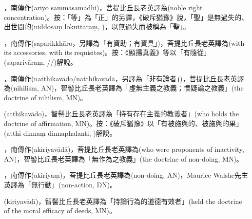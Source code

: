 \startitemgroup[noteitems]
\item{}，南傳作(ariyo sammāsamādhi)，菩提比丘長老英譯為(noble right concentration)。按：「等」為「正」的另譯，《破斥猶豫》說，「聖」是無過失的、出世間的(niddosaṃ lokuttaraṃ, )，以無過失而被稱為「聖」。
\stopitemgroup

\startitemgroup[noteitems]
\item{}，南傳作(saparikkhāro，另譯為「有資助；有資具」)，菩提比丘長老英譯為(with its accessories, with its requisites)。按：《顯揚真義》等以「有隨從」(saparivāraṃ, //)解說。
\stopitemgroup

\startitemgroup[noteitems]
\item{}，南傳作(natthikavādo/natthikavādā，另譯為「非有論者」)，菩提比丘長老英譯為(nihilism, AN)，智髻比丘長老英譯為「虛無主義之教義；懷疑論之教義」(the doctrine of nihilism, MN)。
\item{}(atthikavādo)，智髻比丘長老英譯為「持有存在主義的教義者」(who holds the doctrine of affirmation, MN)。按：《破斥猶豫》以「有被施與的、被施與的果」(atthi dinnaṃ dinnaphalanti, )解說。
\stopitemgroup

\startitemgroup[noteitems]
\item{}，南傳作(akiriyavādā)，菩提比丘長老英譯為(who were proponents of inactivity, AN)，智髻比丘長老英譯為「無作為之教義」(the doctrine of non-doing, MN)。
\item{}，南傳作(akiriyaṃ)，菩提比丘長老英譯為(non-doing, AN)，Maurice Walshe先生英譯為「無行動」(non-action, DN)。
\item{}(kiriyavādī)，智髻比丘長老英譯為「持論行為的道德有效者」(held the doctrine of the moral efficacy of deeds, MN)。
\stopitemgroup

